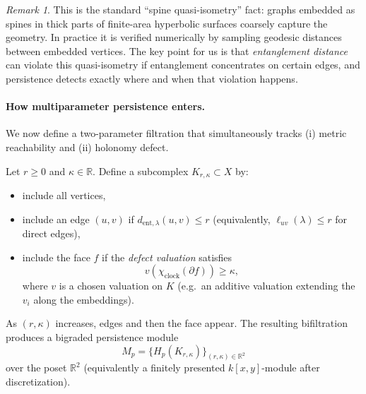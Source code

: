 \documentclass[11pt,oneside]{amsbook}
\numberwithin{equation}{section}
\theoremstyle{plain}
\theoremstyle{definition}
\theoremstyle{remark}
\newtheorem{remark}[theorem]{Remark}
\newcommand{\R}{\mathbb{R}}
\begin{document}
\begin{remark}
This is the standard ``spine quasi-isometry'' fact: graphs embedded as spines in thick parts of finite-area hyperbolic surfaces coarsely capture the geometry.
In practice it is verified numerically by sampling geodesic distances between embedded vertices.
The key point for us is that \emph{entanglement distance} can violate this quasi-isometry if entanglement concentrates on certain edges, and persistence detects exactly where and when that violation happens.
\end{remark}

\paragraph{How multiparameter persistence enters.}
We now define a two-parameter filtration that simultaneously tracks (i) metric reachability and (ii) holonomy defect.

Let $r\ge 0$ and $\kappa\in\R$.
Define a subcomplex $K_{r,\kappa}\subset X$ by:
\begin{itemize}
\item include all vertices,
\item include an edge $(u,v)$ if $d_{\mathrm{ent},\lambda}(u,v)\le r$ (equivalently, $\ell_{uv}(\lambda)\le r$ for direct edges),
\item include the face $f$ if the \emph{defect valuation} satisfies
\[
v\!\left(\chi_{\mathrm{clock}}(\partial f)\right)\ge \kappa,
\]
where $v$ is a chosen valuation on $K$ (e.g.\ an additive valuation extending the $v_i$ along the embeddings).
\end{itemize}

As $(r,\kappa)$ increases, edges and then the face appear.
The resulting bifiltration produces a bigraded persistence module
\[
M_{p}=\{H_p(K_{r,\kappa})\}_{(r,\kappa)\in\R^2}
\]
over the poset $\R^2$ (equivalently a finitely presented $k[x,y]$-module after discretization).
\end{document}

